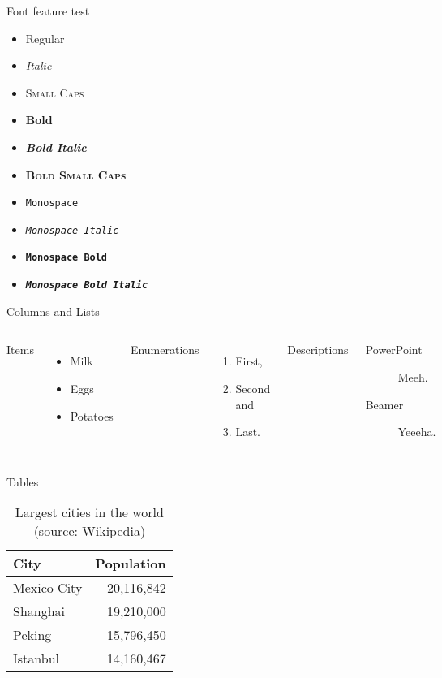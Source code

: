 \begin{frame}{Font feature test}
  \begin{itemize}
    \item Regular
    \item \textit{Italic}
    \item \textsc{Small Caps}
    \item \textbf{Bold}
    \item \textbf{\textit{Bold Italic}}
    \item \textbf{\textsc{Bold Small Caps}}
    \item \texttt{Monospace}
    \item \texttt{\textit{Monospace Italic}}
    \item \texttt{\textbf{Monospace Bold}}
    \item \texttt{\textbf{\textit{Monospace Bold Italic}}}
  \end{itemize}
\end{frame}

\begin{frame}{Columns and Lists}
  \begin{columns}[T,onlytextwidth]
      Items
      \begin{itemize}
        \item Milk \item Eggs \item Potatoes
      \end{itemize}

      Enumerations
      \begin{enumerate}
        \item First, \item Second and \item Last.
      \end{enumerate}

      Descriptions
      \begin{description}
        \item[PowerPoint] Meeh. \item[Beamer] Yeeeha.
      \end{description}
  \end{columns}
\end{frame}

\begin{frame}{Tables}
  \begin{table}
    \caption{Largest cities in the world (source: Wikipedia)}
    \begin{tabular}{@{} lr @{}}
      \toprule
      City & Population\\
      \midrule
      Mexico City & 20,116,842\\
      Shanghai & 19,210,000\\
      Peking & 15,796,450\\
      Istanbul & 14,160,467\\
      \bottomrule
    \end{tabular}
  \end{table}
\end{frame}

